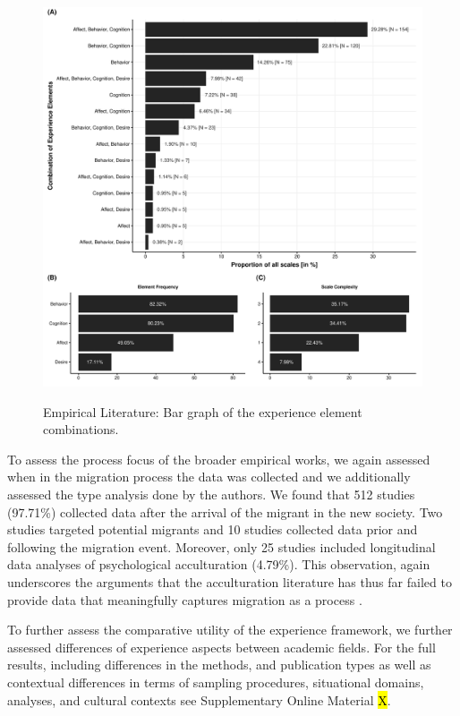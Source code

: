 \begin{figure}[h]
\centering
\caption{Empirical Literature: Bar graph of the experience element combinations.}
\includegraphics[width=\textwidth]{Figures/EmpPlotFreq-1}
\label{fig:EmpPlotFreq-1}
\end{figure}

To assess the process focus of the broader empirical works, we again
assessed when in the migration process the data was collected and we
additionally assessed the type analysis done by the authors. We found
that 512 studies (97.71\%) collected data after the arrival of the
migrant in the new society. Two studies targeted potential migrants and
10 studies collected data prior and following the migration event.
Moreover, only 25 studies included longitudinal data analyses of
psychological acculturation (4.79\%). This observation, again
underscores the arguments that the acculturation literature has thus far
failed to provide data that meaningfully captures migration as a process
\citep[e.g.,][]{Brown2011, Ward2019}.

To further assess the comparative utility of the experience framework,
we further assessed differences of experience aspects between academic
fields. For the full results, including differences in the methods, and
publication types as well as contextual differences in terms of sampling
procedures, situational domains, analyses, and cultural contexts see
Supplementary Online Material \hl{X}.

